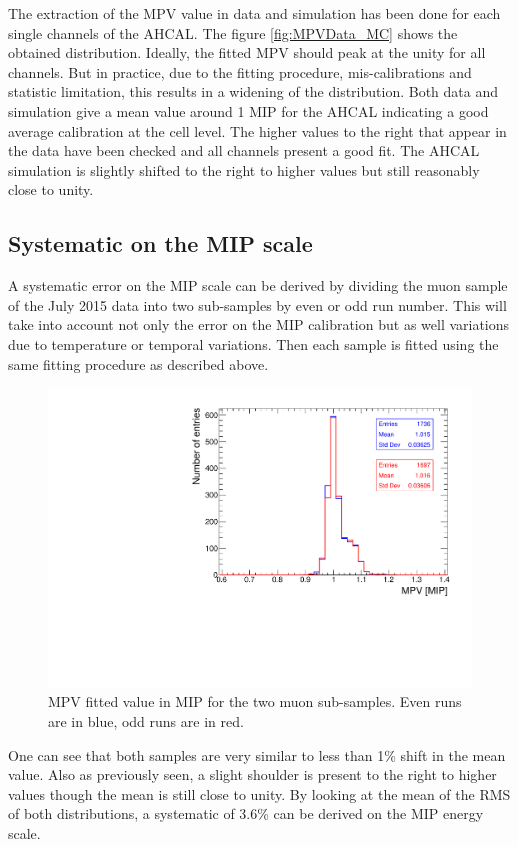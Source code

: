The extraction of the MPV value in data and simulation has been done for each single channels of the AHCAL. The figure \ref{fig:MPVData_MC} shows the obtained distribution. Ideally, the fitted MPV should peak at the unity for all channels. But in practice, due to the fitting procedure, mis-calibrations and statistic limitation, this results in a widening of the distribution. Both data and simulation give a mean value around 1 MIP for the AHCAL indicating a good average calibration at the cell level. The higher values to the right that appear in the data have been checked and all channels present a good fit. The AHCAL simulation is slightly shifted to the right to higher values but still reasonably close to unity.

\subsection{Systematic on the MIP scale}

A systematic error on the MIP scale can be derived by dividing the muon sample of the July 2015 data into two sub-samples by even or odd run number. This will take into account not only the error on the MIP calibration but as well variations due to temperature or temporal variations. Then each sample is fitted using the same fitting procedure as described above.

\begin{figure}[htbp!]
	\centering
	\includegraphics[width=0.7\linewidth]{../Thesis_Plots/EnergyCalib/Plots/SystematicMIP.pdf}
	\caption{MPV fitted value in MIP for the two muon sub-samples. Even runs are in blue, odd runs are in red.} \label{fig:MIPSyst}
\end{figure}

One can see that both samples are very similar to less than 1\% shift in the mean value. Also as previously seen, a slight shoulder is present to the right to higher values though the mean is still close to unity. By looking at the mean of the RMS of both distributions, a systematic of 3.6\% can be derived on the MIP energy scale.

